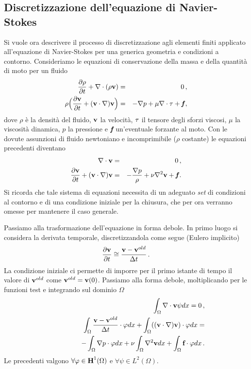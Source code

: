 \subsection{Discretizzazione dell'equazione di Navier-Stokes}
Si vuole ora descrivere il processo di discretizzazione agli elementi finiti 
applicato all'equazione di Navier-Stokes per una generica geometria e 
condizioni a contorno. 
Consideriamo le equazioni di conservazione della massa e della quantità di moto
per un fluido
\begin{eqnarray}
	 \frac{\partial \rho}{\partial t}+\nabla\cdot (\rho {\bf v})=&& \ 0 \,,\\
	\rho\Big( \frac{\partial {\bf v}}{\partial t}+({\bf v} \cdot \nabla){\bf v} \Big)=
	&&-\nabla p+ \mu \nabla \cdot {\bf \tau}+ \textit{\textbf{f}} \,,
\end{eqnarray}
dove $\rho$ è la densità del fluido, ${\bf v}$ la velocità, ${\bf \tau}$ il tensore degli
sforzi viscosi, $\mu$ la viscosità dinamica, $p$ la pressione e $\textit{\textbf{f}}$ 
un'eventuale forzante al moto. 
Con le dovute assunzioni di fluido newtoniano e incomprimibile ($\rho$ costante)
le equazioni precedenti diventano
\begin{eqnarray} \label{ff2}
	\nabla\cdot  {\bf v}=&&\ 0 \,,\\ 
	\frac{\partial {\bf v}}{\partial t}+({\bf v} \cdot \nabla){\bf v} =
	&& -\frac{\nabla p}{\rho}+ \nu \nabla^{2}{\bf v}+ \textit{\textbf{f}}\,.
\end{eqnarray} 
Si ricorda che tale sistema di equazioni necessita di un adeguato \textit{set} di
condizioni al contorno e di una condizione iniziale per la chiusura, che per ora verranno
omesse per mantenere il caso generale. 

Passiamo alla trasformazione dell'equazione in forma debole.
In primo luogo si considera la derivata temporale, 
discretizzandola come segue (Eulero implicito)
\begin{equation}
\frac{\partial {\bf v}}{\partial t}\cong \frac{{\bf v}-{\bf v}^{old}}{\Delta t}\,.
\end{equation}
La condizione iniziale ci permette di imporre per il primo istante di tempo il valore 
di ${\bf v}^{old}$ come ${\bf v}^{old}={\bf v}(0)$. Passiamo alla forma debole, 
moltiplicando per le funzioni test e integrando 
sul dominio $\Omega$
\begin{eqnarray} 
&& \int_{\Omega} \nabla \cdot {\bf v} \psi dx =0 \,,\\ \label{fdd2} 
&& \int_{\Omega} \frac{ {\bf v}-{\bf v}^{old} }{\Delta t} \cdot {\bf \varphi} dx 
+ \int_{\Omega} (({\bf v} \cdot \nabla){\bf v})\cdot {\bf \varphi} dx=  \nonumber \\ 
&& \qquad \qquad -
\int_{\Omega}\nabla p \cdot {\bf \varphi}dx +\nu \int_{\Omega} \nabla^{2} {\bf v}dx 
+\int_{\Omega} \textbf{f}\cdot {\bf \varphi}dx  \,.
\end{eqnarray}
Le precedenti valgono $\forall  {\bf \varphi}\in \textbf{H}^{1}(\Omega)$ e $\forall  \psi \in L^{2}(\Omega)$. 

